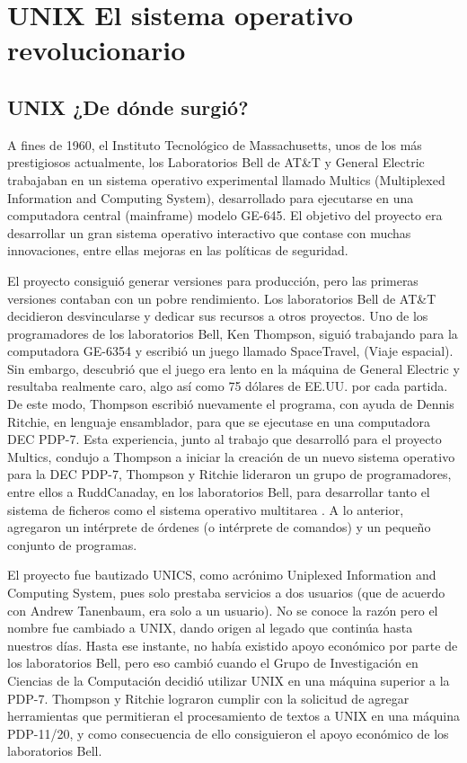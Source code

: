 \chapter*{UNIX El sistema operativo revolucionario}

\section*{UNIX ¿De dónde surgió?}
A fines de 1960, el Instituto Tecnológico de Massachusetts, unos  de los más prestigiosos actualmente, los Laboratorios Bell de AT\&T y General Electric trabajaban en un sistema 
operativo experimental llamado Multics (Multiplexed Information and Computing System), desarrollado para ejecutarse en una computadora central (mainframe) modelo GE-645. El 
objetivo del proyecto era desarrollar un gran sistema operativo interactivo que contase con muchas innovaciones, entre ellas mejoras en las políticas de seguridad.
 
El proyecto consiguió generar versiones para producción, pero las primeras versiones contaban con un pobre rendimiento. Los laboratorios Bell de AT\&T decidieron desvincularse y 
dedicar sus recursos a otros proyectos. Uno de los programadores de los laboratorios Bell, Ken Thompson, siguió trabajando para la computadora GE-6354 y escribió un juego llamado 
SpaceTravel, (Viaje espacial). Sin embargo, descubrió que el juego era lento en la máquina de General Electric y resultaba realmente caro, algo así como 75 dólares de EE.UU. por 
cada partida. De este modo, Thompson escribió nuevamente el programa, con ayuda de Dennis Ritchie, en lenguaje ensamblador, para que se ejecutase en una computadora DEC PDP-7. 
Esta experiencia, junto al trabajo que desarrolló para el proyecto Multics, condujo a Thompson a iniciar la creación de un nuevo sistema operativo para la DEC PDP-7, Thompson y 
Ritchie lideraron un grupo de programadores, entre ellos a RuddCanaday, en los laboratorios Bell, para desarrollar tanto el sistema de ficheros como el sistema operativo 
multitarea . A lo anterior, agregaron un intérprete de órdenes (o intérprete de comandos) y un pequeño conjunto de programas.
 
El proyecto fue bautizado UNICS, como acrónimo Uniplexed Information and Computing System, pues solo prestaba servicios a dos usuarios (que de acuerdo con Andrew Tanenbaum, era 
solo a un usuario). No se conoce la razón pero el nombre fue cambiado a UNIX, dando origen al legado que continúa hasta nuestros días. Hasta ese instante, no había existido  
apoyo económico por parte de los laboratorios Bell, pero eso cambió cuando el Grupo de Investigación en Ciencias de la Computación decidió utilizar UNIX en una máquina superior a 
la PDP-7. Thompson y Ritchie lograron cumplir con la solicitud de agregar herramientas que permitieran el procesamiento de textos a UNIX en una máquina PDP-11/20, y como 
consecuencia de ello consiguieron el apoyo económico de los laboratorios Bell.
 
